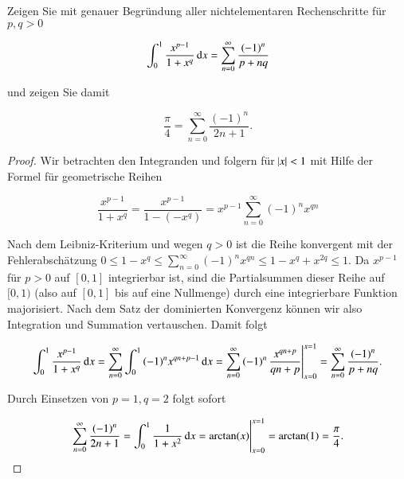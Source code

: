 
\begin{exercise}
  Zeigen Sie mit genauer Begründung aller nichtelementaren Rechenschritte für $p,q>0$

  \begin{equation*}
    \int_0^1{\frac{x^{p-1}}{1+x^q} \dif x}=\sum_{n=0}^\infty{\frac{{(-1)}^n}{p+nq}}
  \end{equation*}

  und zeigen Sie damit

  \begin{equation*}
    \frac{\pi}{4}=\sum_{n=0}^\infty{\frac{{(-1)}^n}{2n+1}}.
  \end{equation*}

\end{exercise}

\begin{proof}
  Wir betrachten den Integranden und folgern für $\abs{x}<1$ mit Hilfe der Formel für geometrische Reihen

  \begin{equation*}
    \frac{x^{p-1}}{1+x^q}
    = \frac{x^{p-1}}{1-(-x^q)}
    = x^{p-1}\sum_{n=0}^\infty{{(-1)}^n x^{qn}}
  \end{equation*}

  Nach dem Leibniz-Kriterium und wegen $q>0$ ist die Reihe konvergent mit der Fehlerabschätzung $0 \leq 1-x^q \leq \sum_{n=0}^\infty{{(-1)}^n x^{qn}} \leq 1-x^q+x^{2q} \leq 1$. Da $x^{p-1}$ für $p>0$ auf $[0,1]$ integrierbar ist, sind die Partialsummen dieser Reihe auf $[0,1)$ (also auf $[0,1]$ bis auf eine Nullmenge) durch eine integrierbare Funktion majorisiert. Nach dem Satz der dominierten Konvergenz können wir also Integration und Summation vertauschen. Damit folgt

  \begin{equation*}
    \int_0^1{\frac{x^{p-1}}{1+x^q} \dif x}
    = \sum_{n=0}^\infty{\int_0^1{{(-1)}^n x^{qn+p-1} \dif x}}
    = \sum_{n=0}^\infty{{(-1)}^n \eval{\frac{x^{qn+p}}{qn+p}}_{x=0}^{x=1}}
    = \sum_{n=0}^\infty{\frac{{(-1)}^n}{p+nq}}.
  \end{equation*}

  Durch Einsetzen von $p=1,q=2$ folgt sofort

  \begin{equation*}
    \sum_{n=0}^\infty{\frac{{(-1)}^n}{2n+1}}
    = \int_0^1{\frac{1}{1+x^2}\dif x}
    = \eval{\arctan(x)}_{x=0}^{x=1}=\arctan(1)=\frac{\pi}{4}.
  \end{equation*}
\end{proof}
